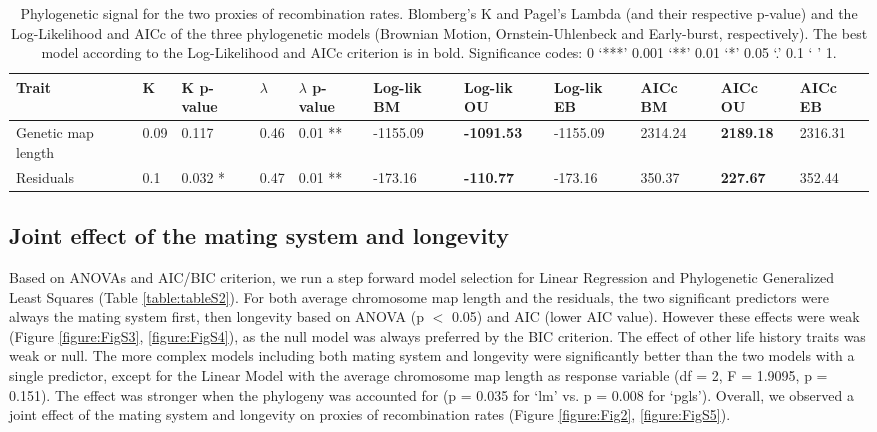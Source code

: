 \documentclass{article}
\begin{document}
\begin{table}[ht]
\centering{}
\caption{Phylogenetic signal for the two proxies of recombination rates. Blomberg’s K and Pagel’s Lambda (and their respective p-value) and the Log-Likelihood and AICc of the three phylogenetic models (Brownian Motion, Ornstein-Uhlenbeck and Early-burst, respectively). The best model according to the Log-Likelihood and AICc criterion is in bold. Significance codes: 0 ‘***’ 0.001 ‘**’ 0.01 ‘*’ 0.05 ‘.’ 0.1 ‘ ’ 1.}
\begin{adjustbox}{width=1\textwidth}
\small
\begin{tabular}{lllllllllll}
Trait & K & K p-value & $\lambda$ & $\lambda$ p-value & Log-lik BM & Log-lik OU & Log-lik EB & AICc BM & AICc OU & AICc EB \\ \hline
Genetic map length & 0.09 & 0.117  & 0.46  & 0.01 ** & -1155.09 & \textbf{-1091.53} & -1155.09 & 2314.24 &	\textbf{2189.18} &	2316.31 \\
Residuals & 0.1  & 0.032 *  & 0.47 & 0.01 ** & -173.16 & \textbf{-110.77} & -173.16 & 350.37 &	\textbf{227.67} &	352.44 
\end{tabular}
\end{adjustbox}
\label{table:table1}
\end{table}




\subsection*{Joint effect of the mating system and longevity}


Based on ANOVAs and AIC/BIC criterion, we run a step forward model selection for Linear Regression and Phylogenetic Generalized Least Squares (Table \ref{table:tableS2}). For both average chromosome map length and the residuals, the two significant predictors were always the mating system first, then longevity based on ANOVA (p $<$ 0.05) and AIC (lower AIC value). However these effects were weak (Figure \ref{figure:FigS3}, \ref{figure:FigS4}), as the null model was always preferred by the BIC criterion. The effect of other life history traits was weak or null. The more complex models including both mating system and longevity were significantly better than the two models with a single predictor, except for the Linear Model with the average chromosome map length as response variable (df = 2, F = 1.9095, p = 0.151). The effect was stronger when the phylogeny was accounted for (p = 0.035 for ‘lm’ vs. p = 0.008 for ‘pgls’). Overall, we observed a joint effect of the mating system and longevity on proxies of recombination rates (Figure \ref{figure:Fig2}, \ref{figure:FigS5}).
\end{document}
